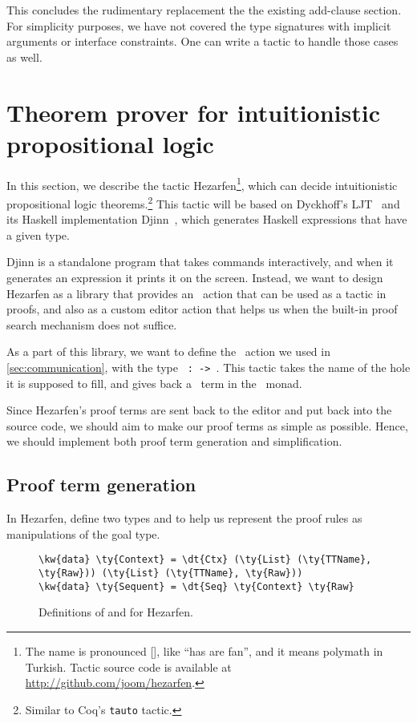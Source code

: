 This concludes the rudimentary replacement the the existing add-clause section.
For simplicity purposes, we have not covered the type signatures with implicit
arguments or interface constraints. One can write a tactic to handle
those cases as well.

\section{Theorem prover for intuitionistic propositional logic}\label{sec:hezarfen}

In this section, we describe the tactic Hezarfen\footnote{ The name is
  pronounced {[]}, like ``has are fan'', and it means
    polymath in Turkish.  Tactic source code is available at
    \url{http://github.com/joom/hezarfen}.}, which can decide intuitionistic
propositional logic theorems.\footnote{Similar to Coq's \texttt{tauto} tactic.}
This tactic will be based on Dyckhoff's LJT~\cite{ljt} and its Haskell
implementation Djinn~\cite{djinn}, which generates Haskell expressions
that have a given type.

Djinn is a standalone program that takes commands
interactively, and when it generates an expression it prints it on the screen.
Instead, we want to design Hezarfen as a library that provides an \Elab\ action
that can be used as a tactic in proofs, and also as a custom editor action that
helps us when the built-in proof search mechanism does not suffice.

As a part of this library, we want to define the \Elab\ action we used in
\autoref{sec:communication}, with the type
\texttt{ :  ->  }.
This tactic takes the name of the hole it is supposed to fill, and gives back a
\TT\ term in the \Elab\ monad.

Since Hezarfen's proof terms are sent back to the editor and put back into the
source code, we should aim to make our proof terms as simple as possible.
Hence, we should implement both proof term generation and simplification.

\subsection{Proof term generation}

In Hezarfen, define two types  and  to help us
represent the proof rules as manipulations of the goal type.

\begin{figure}[ht]
\caption{Definitions of  and  for Hezarfen.}
\label{code:hezarfenTypes}
\begin{Verbatim}[framesep=2mm, label=\footnotesize{\normalfont{Idris}}, labelposition=topline]
\kw{data} \ty{Context} = \dt{Ctx} (\ty{List} (\ty{TTName}, \ty{Raw})) (\ty{List} (\ty{TTName}, \ty{Raw}))
\kw{data} \ty{Sequent} = \dt{Seq} \ty{Context} \ty{Raw}
\end{Verbatim}
\end{figure}

